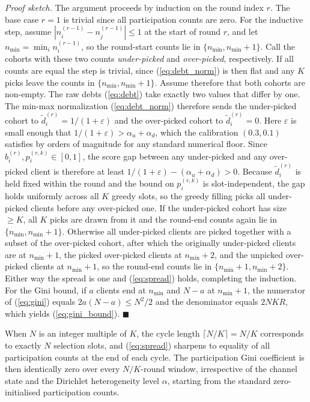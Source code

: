 \documentclass[journal]{IEEEtran}
\newcommand{\revIVE}[1]{#1}
\newcommand{\rev}[1]{#1}
\begin{document}
\textit{Proof sketch.} The argument proceeds by induction on the round index $r$. The base case $r = 1$ is trivial since all participation counts are zero. For the inductive step, assume $|n_i^{(r-1)} - n_j^{(r-1)}| \le 1$ at the start of round $r$, and let $n_{\min} = \min_i n_i^{(r-1)}$, so the round-start counts lie in $\{n_{\min}, n_{\min}+1\}$. Call the cohorts with these two counts \emph{under-picked} and \emph{over-picked}, respectively. \rev{If all counts are equal the step is trivial, since (\ref{eq:debt_norm}) is then flat and any $K$ picks leave the counts in $\{n_{\min}, n_{\min}+1\}$. Assume therefore that both cohorts are non-empty.} The raw debts (\ref{eq:debt}) take exactly two values that differ by one. The min-max normalization (\ref{eq:debt_norm}) therefore sends the under-picked cohort to $\tilde{d}_i^{(r)} = 1/(1+\varepsilon)$ and the over-picked cohort to $\tilde{d}_i^{(r)} = 0$. \revIVE{Here $\varepsilon$ is small enough that $1/(1+\varepsilon) > \alpha_u + \alpha_d$, which the calibration $(0.3, 0.1)$ satisfies by orders of magnitude for any standard numerical floor.} Since $b_i^{(r)}, p_i^{(r,k)} \in [0,1]$, the score gap between any under-picked and any over-picked client is therefore at least $1/(1+\varepsilon) - (\alpha_u + \alpha_d) > 0$. \revIVE{Because $\tilde{d}_i^{(r)}$ is held fixed within the round and the bound on $p_i^{(r,k)}$ is slot-independent, the gap holds uniformly across all $K$ greedy slots,} so the greedy filling picks all under-picked clients before any over-picked one. If the under-picked cohort has size $\ge K$, all $K$ picks are drawn from it and the round-end counts again lie in $\{n_{\min}, n_{\min}+1\}$. Otherwise all under-picked clients are picked together with a subset of the over-picked cohort, after which the originally under-picked clients are at $n_{\min}+1$, the picked over-picked clients at $n_{\min}+2$, and the unpicked over-picked clients at $n_{\min}+1$, so the round-end counts lie in $\{n_{\min}+1, n_{\min}+2\}$. Either way the spread is one and (\ref{eq:spread}) holds, completing the induction. For the Gini bound, if $a$ clients end at $n_{\min}$ and $N-a$ at $n_{\min}+1$, the numerator of (\ref{eq:gini}) equals $2a(N-a) \le N^2/2$ and the denominator equals $2NKR$, which yields (\ref{eq:gini_bound}). \hfill$\blacksquare$

When $N$ is an integer multiple of $K$, the cycle length $\lceil N/K \rceil = N/K$ corresponds to exactly $N$ selection slots, and (\ref{eq:spread}) sharpens to equality of all participation counts at the end of each cycle. The participation Gini coefficient is then identically zero over every $N/K$-round window, irrespective of the channel state and the Dirichlet heterogeneity level $\alpha$, starting from the standard zero-initialised participation counts.
\end{document}
